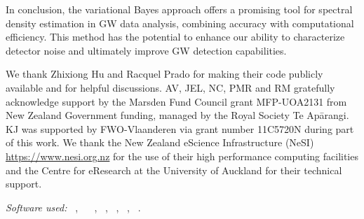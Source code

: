 \documentclass[%
 reprint,
 amsmath,amssymb,
 aps,
 nofootinbib,
]{revtex4-2}
\begin{document}
In conclusion, the variational Bayes approach offers a promising tool for spectral density estimation in GW data analysis, combining accuracy with computational efficiency. This method has the potential to enhance our ability to characterize detector noise and ultimately improve GW detection capabilities.







\begin{acknowledgments}
We thank Zhixiong Hu and Racquel Prado for making their code publicly available and for helpful discussions. AV,  JEL, NC, PMR and RM gratefully acknowledge support  by the Marsden Fund Council grant MFP-UOA2131 from New Zealand Government funding, managed by the Royal Society Te Apārangi. KJ was supported by FWO-Vlaanderen via grant number 11C5720N during part of this work.
We thank the New Zealand eScience Infrastructure
(NeSI) \url{https://www.nesi.org.nz} for the use of their high performance computing facilities and the Centre for eResearch at the University of Auckland for their technical
support.
\end{acknowledgments}


\vspace{4mm}
\noindent\textit{Software used:}
\python~\cite{python2020},
\tensorflowProb~\cite{tensorflow, tensorflowProb}
\numpy~\cite{numpy},
\scipy~\cite{scipy},
\pandas~\cite{pandas},
\matplotlib~\cite{matplotlib},
\jupyterbook~\cite{jupyterbook}.




\end{document}

